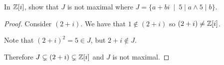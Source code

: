 \documentclass[../hw8]{subfiles}
\begin{document}
\begin{problem}
In $\mathbb{Z}[i]$, show that $J$ is not maximal where $J=\{a+bi\ \mid\ 5\mid a \land 5 \mid b  \} $.
\end{problem}
\begin{proof}
	Consider $(2+i)$.
	We have that $1\not\in (2+i)$ so $(2+i)\neq \mathbb{Z}[i]$.

	Note that  $(2+i)^2 = 5 \in J$, but $2+i \not\in J$.

	Therefore $J\subsetneq (2+i)\subsetneq \mathbb{Z}[i]$ and $J$ is not maximal.
\end{proof}
\end{document}
